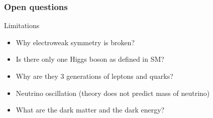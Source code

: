 \documentclass{beamer}
\begin{document}
    \begin{frame}
      \frametitle{Open questions}


      \begin{alertblock}{Limitations}
        \begin{itemize}
          \item Why electroweak symmetry is broken?
          \item Is there only one Higgs boson as defined in SM?
          \item Why are they 3 generations of leptons and quarks?
          \item Neutrino oscillation (theory does not predict mass of neutrino)
          \item What are the dark matter and the dark energy?
        \end{itemize}
      \end{alertblock}
      
    \end{frame}
    
\end{document}
